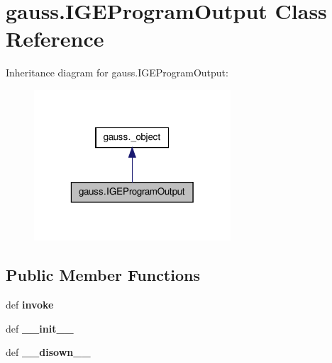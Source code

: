 \hypertarget{classgauss_1_1_i_g_e_program_output}{\section{gauss.\-I\-G\-E\-Program\-Output Class Reference}
\label{classgauss_1_1_i_g_e_program_output}
}


Inheritance diagram for gauss.\-I\-G\-E\-Program\-Output\-:\nopagebreak
\begin{figure}[H]
\begin{center}
\leavevmode
\includegraphics[width=208pt]{classgauss_1_1_i_g_e_program_output__inherit__graph}
\end{center}
\end{figure}
\subsection*{Public Member Functions}
\begin{DoxyCompactItemize}
\item 
\hypertarget{classgauss_1_1_i_g_e_program_output_a3927fdd97fe46432f1f8350ff5669f3b}{def {\bfseries invoke}}\label{classgauss_1_1_i_g_e_program_output_a3927fdd97fe46432f1f8350ff5669f3b}

\item 
\hypertarget{classgauss_1_1_i_g_e_program_output_a5db77c78b695b0be20ebcc57f753432c}{def {\bfseries \-\_\-\-\_\-init\-\_\-\-\_\-}}\label{classgauss_1_1_i_g_e_program_output_a5db77c78b695b0be20ebcc57f753432c}

\item 
\hypertarget{classgauss_1_1_i_g_e_program_output_afbe955616417e930867743211998a007}{def {\bfseries \-\_\-\-\_\-disown\-\_\-\-\_\-}}\label{classgauss_1_1_i_g_e_program_output_afbe955616417e930867743211998a007}

\end{DoxyCompactItemize}
